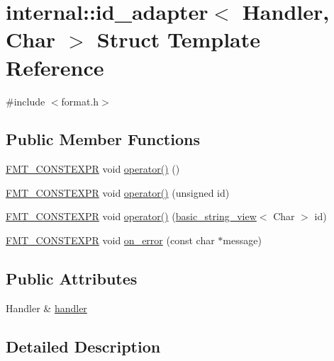 \hypertarget{structinternal_1_1id__adapter}{}\section{internal\+:\+:id\+\_\+adapter$<$ Handler, Char $>$ Struct Template Reference}
\label{structinternal_1_1id__adapter}


{\ttfamily \#include $<$format.\+h$>$}

\subsection*{Public Member Functions}
\begin{DoxyCompactItemize}
\item 
\hyperlink{core_8h_a69201cb276383873487bf68b4ef8b4cd}{F\+M\+T\+\_\+\+C\+O\+N\+S\+T\+E\+X\+PR} void \hyperlink{structinternal_1_1id__adapter_a28539391bce96a9118b6e21f2fccb888}{operator()} ()
\item 
\hyperlink{core_8h_a69201cb276383873487bf68b4ef8b4cd}{F\+M\+T\+\_\+\+C\+O\+N\+S\+T\+E\+X\+PR} void \hyperlink{structinternal_1_1id__adapter_a0f76229cd15c8aa66dee599883a672e4}{operator()} (unsigned id)
\item 
\hyperlink{core_8h_a69201cb276383873487bf68b4ef8b4cd}{F\+M\+T\+\_\+\+C\+O\+N\+S\+T\+E\+X\+PR} void \hyperlink{structinternal_1_1id__adapter_a9e046831c2198e748c7d9cf56991ef2d}{operator()} (\hyperlink{classbasic__string__view}{basic\+\_\+string\+\_\+view}$<$ Char $>$ id)
\item 
\hyperlink{core_8h_a69201cb276383873487bf68b4ef8b4cd}{F\+M\+T\+\_\+\+C\+O\+N\+S\+T\+E\+X\+PR} void \hyperlink{structinternal_1_1id__adapter_a2e03feac07a2d549161205d50b96fe45}{on\+\_\+error} (const char $\ast$message)
\end{DoxyCompactItemize}
\subsection*{Public Attributes}
\begin{DoxyCompactItemize}
\item 
Handler \& \hyperlink{structinternal_1_1id__adapter_a0db6b62cfd71e15f58fc5006d5cbd54e}{handler}
\end{DoxyCompactItemize}


\subsection{Detailed Description}
